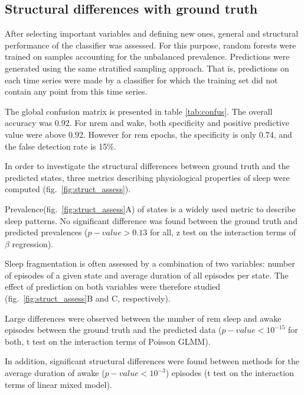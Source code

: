 


\subsection{Structural differences with ground truth}



After selecting important variables and defining new ones, general and structural performance of the classifier was assessed.
For this purpose, random forests were trained on samples accounting for the unbalanced prevalence.
Predictions were generated using the same stratified sampling approach.
That is, predictions on each time series were made by a classifier for which
the training set did not contain any point from this time series.




The global confusion matrix is presented in table \ref{tab:confus}. The overall accuracy was 0.92.
For \gls{nrem} and wake, both specificity and positive predictive value were above 0.92. However
for \gls{rem} epochs, the specificity is only 0.74, and the false detection rate is 15\%.

In order to investigate the structural differences between ground truth and the predicted states,
three metrics describing physiological properties of sleep were computed (fig.~\ref{fig:struct_assess}).

Prevalence(fig.~\ref{fig:struct_assess}A) of states is a widely used metric to
describe sleep patterns.
No significant difference was found between the ground truth and predicted prevalences ($p-value > 0.13$ for all, z test on the interaction terms of $\beta$ regression).

Sleep fragmentation is often assessed by a combination of two variables: number of episodes of a given state 
and average duration of all episodes per state\cite{pang_unexpected_2009}. The
effect of prediction on both variables were therefore studied (fig.~\ref{fig:struct_assess}B and C,
respectively).

Large differences were observed between the number of \gls{rem} sleep and awake episodes between the ground truth and the predicted data
($p-value < 10^{-15}$ for both, t test on the interaction terms of Poisson GLMM).

In addition, significant structural differences were found between methods for the average duration of awake ($p-value < 10^{-3}$) episodes 
(t test on the interaction terms of linear mixed model). 

